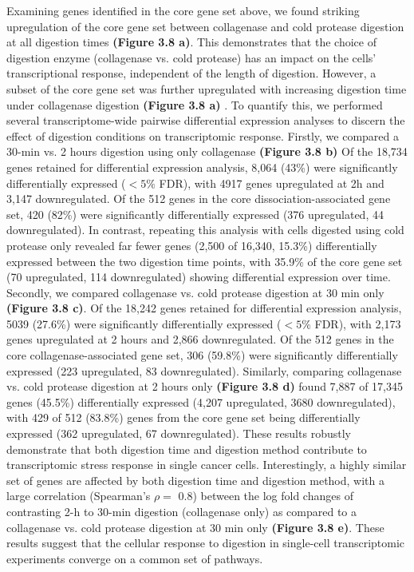 Examining genes identified in the core gene set above, we found striking upregulation of the core gene set between collagenase and cold protease digestion at all digestion times \textbf{(Figure 3.8 a)}. This demonstrates that the choice of digestion enzyme (collagenase vs. cold protease) has an impact on the cells’ transcriptional response, independent of the length of digestion. However, a subset of the core gene set was further upregulated with increasing digestion time under collagenase digestion \textbf{(Figure 3.8 a)} . To quantify this, we performed several transcriptome-wide pairwise differential expression analyses to discern the effect of digestion conditions on transcriptomic response. Firstly, we compared a 30-min vs. 2 hours digestion using only collagenase \textbf{(Figure 3.8 b)} Of the 18,734 genes retained for differential expression analysis, 8,064 (43\%) were significantly differentially expressed ($<5\%$ FDR), with 4917 genes upregulated at 2h and 3,147 downregulated. Of the 512 genes in the core dissociation-associated gene set, 420 (82\%) were significantly differentially expressed (376 upregulated, 44 downregulated).
In contrast, repeating this analysis with cells digested using cold protease only revealed far fewer genes (2,500 of 16,340, 15.3\%) differentially expressed between the two digestion time points, with 35.9\% of the core gene set (70 upregulated, 114 downregulated) showing differential expression over time.
Secondly, we compared collagenase vs. cold protease digestion at 30 min only \textbf{(Figure 3.8 c)}. Of the 18,242 genes retained for differential expression analysis, 5039 (27.6\%) were significantly differentially expressed ($<5\%$ FDR), with 2,173 genes upregulated at 2 hours and 2,866 downregulated. Of the 512 genes in the core collagenase-associated gene set, 306 (59.8\%) were significantly differentially expressed (223 upregulated, 83 downregulated). Similarly, comparing collagenase vs. cold protease digestion at  2 hours only \textbf{(Figure 3.8 d)} found 7,887 of 17,345 genes (45.5\%) differentially expressed (4,207 upregulated, 3680 downregulated), with 429 of 512 (83.8\%) genes from the core gene set being differentially expressed (362 upregulated, 67 downregulated). These results robustly demonstrate that both digestion time and digestion method contribute to transcriptomic stress response in single cancer cells.
Interestingly, a highly similar set of genes are affected by both digestion time and digestion method, with a large correlation (Spearman’s $\rho=$ 0.8) between the log fold changes of contrasting 2-h to 30-min digestion (collagenase only) as compared to a collagenase vs. cold protease digestion at 30 min only \textbf{(Figure 3.8 e)}. These results suggest that the cellular response to digestion in single-cell transcriptomic experiments converge on a common set of pathways.


